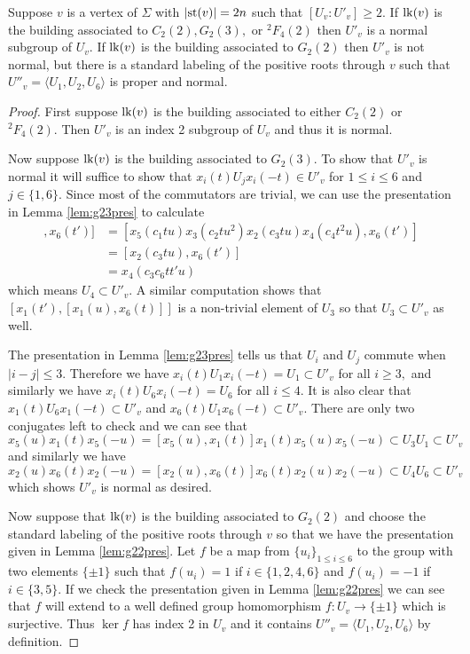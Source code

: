 \documentclass[class=book, crop=false,12 pt]{standalone}
\begin{document}
\begin{lemma}
	\label{lem:normal}
	Suppose $v$ is a vertex of $\Sigma$ with $|\mathrm{st}(v)|=2n$ such that $[U_v:U'_v]\ge 2.$ If $\mathrm{lk}(v)$ is the building associated to $C_2(2),G_2(3),$ or ${}^2F_4(2)$ then $U'_v$ is a normal subgroup of $U_v.$ If $\mathrm{lk}(v)$ is the building associated to $G_2(2)$ then $U'_v$ is not normal, but there is a standard labeling of the positive roots through $v$ such that $U''_v=\langle U_1,U_2,U_6\rangle$ is proper and normal.
\end{lemma}
\begin{proof}
	First suppose $\mathrm{lk}(v)$ is the building associated to either $C_2(2)$ or ${}^2F_4(2).$ Then $U'_v$ is an index 2 subgroup of $U_v$ and thus it is normal.

	Now suppose $\mathrm{lk}(v)$ is the building associated to $G_2(3).$ To show that $U'_v$ is normal it will suffice to show that $x_i(t)U_jx_i(-t)\in U'_v$ for $1\le i\le 6$ and $j\in\{1,6\}.$ Since most of the commutators are trivial, we can use the presentation in Lemma \ref{lem:g23pres} to calculate
	\begin{align*}
		[[x_1(u),x_6(t)],x_6(t')]&=[x_5(c_1 tu)x_3(c_2 tu^2)x_2(c_3 tu)x_4(c_4 t^2u),x_6(t')]\\
					 &=[x_2(c_3tu),x_6(t')]\\
					 &=x_4(c_3c_6tt'u)
	\end{align*}
	which means $U_4\subset U'_v.$ A similar computation shows that $[x_1(t'),[x_1(u),x_6(t)]]$ is a non-trivial element of $U_3$ so that $U_3\subset U'_v$ as well. 

	The presentation in Lemma \ref{lem:g23pres} tells us that $U_i$ and $U_j$ commute when $|i-j|\le 3.$ Therefore we have $x_i(t)U_1x_i(-t)=U_1\subset U'_v$ for all $i\ge 3,$ and similarly we have $x_i(t)U_6x_i(-t)=U_6$ for all $i\le 4.$ It is also clear that $x_1(t)U_6x_1(-t)\subset U'_v$ and $x_6(t)U_1x_6(-t)\subset U'_v.$ There are only two conjugates left to check and we can see that
	\[
		x_5(u)x_1(t)x_5(-u)=[x_5(u),x_1(t)]x_1(t)x_5(u)x_5(-u)\subset U_3U_1\subset U'_v
	\]
	and similarly we have
	\[
		x_2(u)x_6(t)x_2(-u)=[x_2(u),x_6(t)]x_6(t)x_2(u)x_2(-u)\subset U_4U_6\subset U'_v
	\]
	which shows $U'_v$ is normal as desired.


	Now suppose that $\mathrm{lk}(v)$ is the building associated to $G_2(2)$ and choose the standard labeling of the positive roots through $v$ so that we have the presentation given in Lemma \ref{lem:g22pres}. Let $f$ be a map from $\{u_i\}_{1\le i\le 6}$ to the group with two elements $\{\pm 1\}$ such that $f(u_i)=1$ if $i\in \{1,2,4,6\}$ and $f(u_i)=-1$ if $i\in \{3,5\}.$ If we check the presentation given in Lemma \ref{lem:g22pres} we can see that $f$ will extend to a well defined group homomorphism $f:U_v\to \{\pm 1\}$ which is surjective. Thus $\ker f$ has index 2 in $U_v$ and it contains $U''_v=\langle U_1,U_2,U_6\rangle$ by definition. 


\end{proof}
\end{document}
